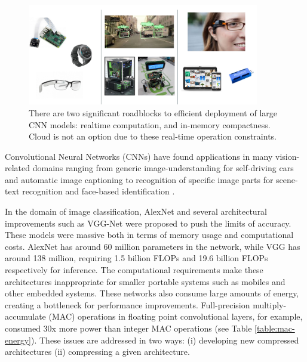 \begin{figure}[h]
\centering
\includegraphics[width=0.9\textwidth]{figures/challenges.png}
\caption{There are two significant roadblocks to efficient deployment of large CNN models: realtime computation, and in-memory compactness. Cloud is not an option due to these real-time operation constraints.}
\label{fig:challenges}
\end{figure}

\noindent Convolutional Neural Networks (CNNs) have found applications in many vision-related domains ranging from generic image-understanding for self-driving cars \cite{bojarski2016end} and automatic image captioning \cite{you2016image,johnson2016densecap} to recognition of specific image parts for scene-text recognition \cite{mishra2012top,neumann2012real} and face-based identification \cite{taigman2014deepface}. 

\noindent In the domain of image classification, AlexNet \cite{alex2012alexnet} and several architectural improvements  such as VGG-Net \cite{simonyan2014very} were proposed to push the limits of accuracy. These models were massive both in terms of memory usage and computational costs. AlexNet has around 60 million parameters in the network, while VGG has around 138 million, requiring 1.5 billion FLOPs and 19.6 billion FLOPs respectively for inference. The computational requirements make these architectures inappropriate for smaller portable systems such as mobiles and other embedded systems. These networks also consume large amounts of energy, creating a bottleneck for performance improvements. Full-precision multiply-accumulate (MAC) operations in floating point convolutional layers, for example, consumed 30x more power than integer MAC operations (see Table \ref{table:mac-energy}). These issues are addressed in two ways: (i) developing new compressed architectures (ii) compressing a given architecture.

